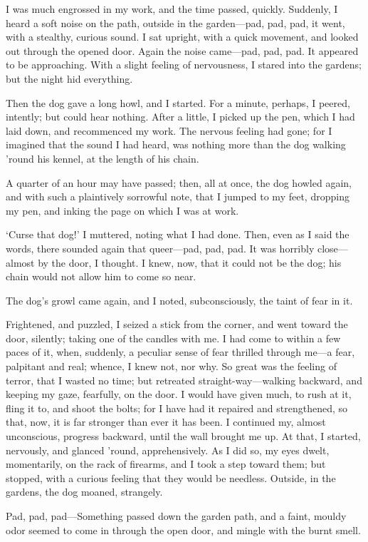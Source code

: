 I was much engrossed in my work, and the time passed, quickly. Suddenly, I heard a soft noise on the path, outside in the garden---pad, pad, pad, it went, with a stealthy, curious sound. I sat upright, with a quick movement, and looked out through the opened door. Again the noise came---pad, pad, pad. It appeared to be approaching. With a slight feeling of nervousness, I stared into the gardens; but the night hid everything.

Then the dog gave a long howl, and I started. For a minute, perhaps, I peered, intently; but could hear nothing. After a little, I picked up the pen, which I had laid down, and recommenced my work. The nervous feeling had gone; for I imagined that the sound I had heard, was nothing more than the dog walking ’round his kennel, at the length of his chain.

A quarter of an hour may have passed; then, all at once, the dog howled again, and with such a plaintively sorrowful note, that I jumped to my feet, dropping my pen, and inking the page on which I was at work.

‘Curse that dog!’ I muttered, noting what I had done. Then, even as I said the words, there sounded again that queer---pad, pad, pad. It was horribly close---almost by the door, I thought. I knew, now, that it could not be the dog; his chain would not allow him to come so near.

The dog’s growl came again, and I noted, subconsciously, the taint of fear in it.

Frightened, and puzzled, I seized a stick from the corner, and went toward the door, silently; taking one of the candles with me. I had come to within a few paces of it, when, suddenly, a peculiar sense of fear thrilled through me---a fear, palpitant and real; whence, I knew not, nor why. So great was the feeling of terror, that I wasted no time; but retreated straight-way---walking backward, and keeping my gaze, fearfully, on the door. I would have given much, to rush at it, fling it to, and shoot the bolts; for I have had it repaired and strengthened, so that, now, it is far stronger than ever it has been. I continued my, almost unconscious, progress backward, until the wall brought me up. At that, I started, nervously, and glanced ’round, apprehensively. As I did so, my eyes dwelt, momentarily, on the rack of firearms, and I took a step toward them; but stopped, with a curious feeling that they would be needless. Outside, in the gardens, the dog moaned, strangely.

Pad, pad, pad---Something passed down the garden path, and a faint, mouldy odor seemed to come in through the open door, and mingle with the burnt smell.

